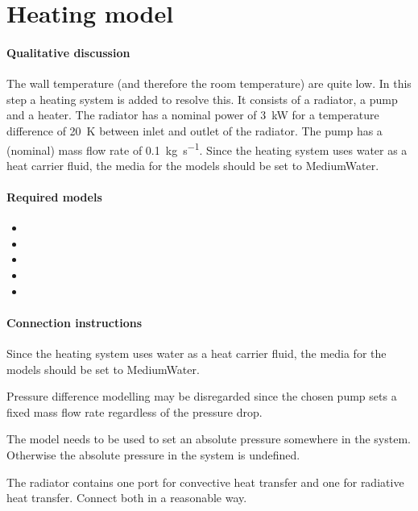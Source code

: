 \documentclass[10pt,a4paper]{article}
\begin{document}
\section{Heating model}
\paragraph{Qualitative discussion}
The wall temperature (and therefore the room temperature) are quite low. 
In this step a heating system is added to resolve this.
It consists of a radiator, a pump and a heater.
The radiator has a nominal power of \SI{3}{\kilo\watt} 
for a temperature difference of \SI{20}{\kelvin} between inlet and outlet
of the radiator.
The pump has a (nominal) mass flow rate of \SI{0.1}{\kilogram\per\second}.
Since the heating system uses water as a heat carrier fluid, 
the media for the models should be set to MediumWater.

\paragraph{Required models}
\begin{itemize}
\item {}
\item {}
\item {}
\item {}
\item {}
\end{itemize}

\paragraph{Connection instructions}
Since the heating system uses water as a heat carrier fluid, 
the media for the models should be set to MediumWater.

Pressure difference modelling may be disregarded since the chosen pump
sets a fixed mass flow rate regardless of the pressure drop.

The  model needs to be used to set an absolute
pressure somewhere in the system. 
Otherwise the absolute 
pressure in the system is undefined.

The radiator contains one port for convective 
heat transfer and one for radiative heat transfer.
Connect both in a reasonable way.
\end{document}

